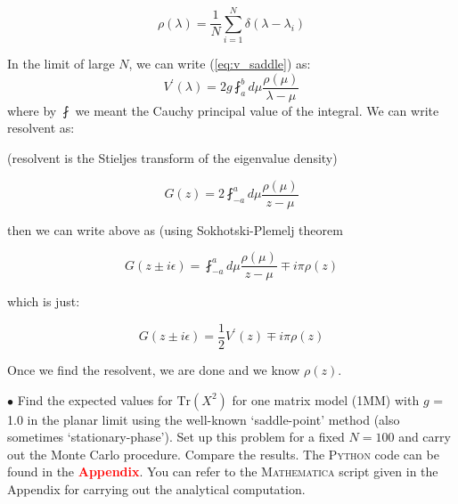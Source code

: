 \documentclass[11pt]{article}
\newcommand{\TODO}[1]{\textcolor{red}{{\bf #1}}}
\begin{document}
\begin{equation}
	\rho(\lambda) = \frac{1}{N} \sum_{i=1}^{N} \delta(\lambda - \lambda_i)
\end{equation}


In the limit of large $N$, we can write (\ref{eq:v_saddle})
as:
\begin{equation}
	V^{\prime}(\lambda) = 2g \fint_{a}^{b} d\mu \frac{\rho(\mu)}{\lambda - \mu} 
\end{equation}
where by $\fint$ we meant the Cauchy principal value of the integral. We can write resolvent as:

(resolvent  is the Stieljes transform of the eigenvalue density)

\begin{equation}
	G(z) = 2 \fint_{-a}^{a} d\mu \frac{\rho(\mu)}{z - \mu}
\end{equation}

then we can write above as (using Sokhotski-Plemelj  theorem


\begin{equation}
	G(z \pm i \epsilon) = \fint_{-a}^{a} d\mu \frac{\rho(\mu)}{z - \mu} \mp i\pi \rho(z) 
\end{equation}

which is just: 


\begin{equation}
	G(z \pm i \epsilon) = \frac{1}{2} V^{\prime}(z) \mp i\pi \rho(z) 
\end{equation}

Once we find the resolvent, we are done and we know $\rho(z)$.  



\begin{mdframed}[backgroundcolor=blue!3] 
	\textsc{} 
	$\bullet$ Find the expected values for $\mathrm{Tr}(X^2)$ for one matrix model (1MM) with $g$ = 1.0 in the planar limit using the well-known `saddle-point' method (also sometimes `stationary-phase'). Set up this problem for a fixed $N=100$ and carry out the Monte Carlo procedure. Compare the results. The \textsc{Python} code can be found in the \TODO{Appendix}.
	You can refer to the \textsc{Mathematica} script given in the Appendix for carrying out the analytical computation.
\end{mdframed} 

\end{document}
